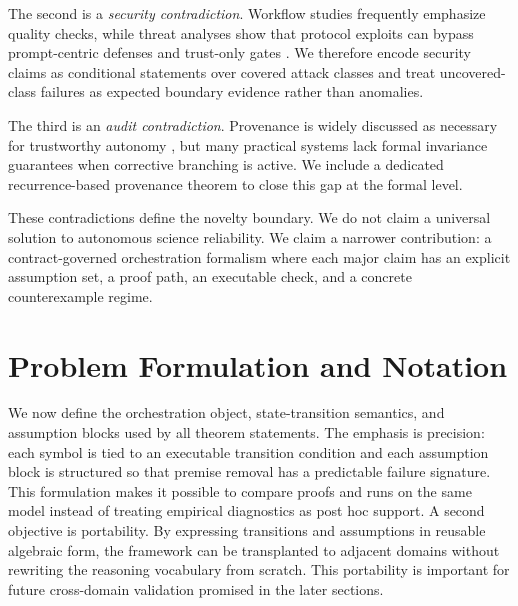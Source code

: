 \documentclass{article} %
\begin{document}
The second is a \emph{security contradiction}. Workflow studies frequently emphasize quality checks, while threat analyses show that protocol exploits can bypass prompt-centric defenses and trust-only gates \citep{ferrag2026,ismail2025,gao2025}. We therefore encode security claims as conditional statements over covered attack classes and treat uncovered-class failures as expected boundary evidence rather than anomalies.

The third is an \emph{audit contradiction}. Provenance is widely discussed as necessary for trustworthy autonomy \citep{glas2026,xin2025,reddy2025}, but many practical systems lack formal invariance guarantees when corrective branching is active. We include a dedicated recurrence-based provenance theorem to close this gap at the formal level.

These contradictions define the novelty boundary. We do not claim a universal solution to autonomous science reliability. We claim a narrower contribution: a contract-governed orchestration formalism where each major claim has an explicit assumption set, a proof path, an executable check, and a concrete counterexample regime.

\section{Problem Formulation and Notation}
\label{sec:problem}
We now define the orchestration object, state-transition semantics, and assumption blocks used by all theorem statements. The emphasis is precision: each symbol is tied to an executable transition condition and each assumption block is structured so that premise removal has a predictable failure signature. This formulation makes it possible to compare proofs and runs on the same model instead of treating empirical diagnostics as post hoc support.
A second objective is portability. By expressing transitions and assumptions in reusable algebraic form, the framework can be transplanted to adjacent domains without rewriting the reasoning vocabulary from scratch. This portability is important for future cross-domain validation promised in the later sections.
\end{document}
